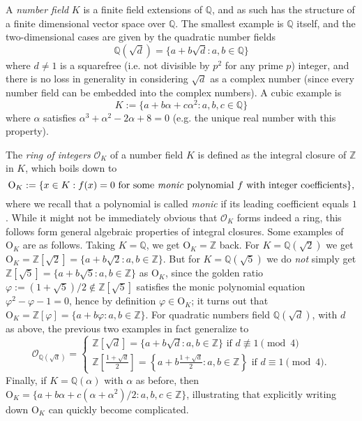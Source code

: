 \documentclass[a4paper,USenglish,cleveref, autoref, thm-restate]{lipics-v2021}
\newcommand{\OK}{\mathrm{O}_K}
\newcommand{\Q}{\mathbb{Q}}
\newcommand{\Z}{\mathbb{Z}}
\begin{document}
A \emph{number field} $K$ is a finite field extensions of $\Q$, and as such has the structure of a finite dimensional vector space over $\Q$. The smallest example is $\Q$ itself, and the two-dimensional cases are given by the quadratic number fields
\[\Q(\sqrt{d})=\{a+b\sqrt{d} : a,b \in \Q\}\]
where $d\not=1$ is a squarefree (i.e. not divisible by $p^2$ for any prime $p$) integer, and there is no loss in generality in considering $\sqrt{d}$ as a complex number (since every number field can be embedded into the complex numbers).
A cubic example is
\[K:=\{a+b\alpha+c \alpha^2: a,b,c \in \Q\}\]
where $\alpha$ satisfies $\alpha^3 + \alpha^2 - 2\alpha + 8=0$ (e.g. the unique real number with this property).

The \emph{ring of integers} $\mathcal{O}_K$ of a number field $K$ is defined as the integral closure of $\Z$ in $K$, which boils down to
\[\OK := \{x \in K : f(x)=0 \text{ for some \emph{monic} polynomial } f \text{ with integer coefficients}\},\]
where we recall that a polynomial is called \emph{monic} if its leading coefficient equals $1$.
While it might not be immediately obvious that $\mathcal{O}_K$ forms indeed a ring, this follows form general algebraic properties of integral closures.
Some examples of $\OK$ are as follows. Taking $K=\Q$, we get $\OK=\Z$ back. For $K=\Q(\sqrt{2})$ we get $\OK=\Z[\sqrt{2}]=\{a+b\sqrt{2} : a,b \in \Z\}$. But for $K=\Q(\sqrt{5})$ we do \emph{not} simply get $\Z[\sqrt{5}]=\{a+b\sqrt{5} : a,b \in \Z\}$ as $\OK$, since the golden ratio $\varphi:=(1+\sqrt{5})/2\not\in \Z[\sqrt{5}]$ satisfies the monic polynomial equation $\varphi^2-\varphi-1=0$, hence by definition $\varphi \in \OK$; it turns out that $\OK=\Z[\varphi]=\{a+b\varphi : a,b \in \Z\}$. For quadratic numbers field $\Q(\sqrt{d})$, with $d$ as above, the previous two examples in fact generalize to
\begin{equation*}
\mathcal{O}_{\Q(\sqrt{d})}=
\begin{cases}
\Z[\sqrt{d}]=\{a+b\sqrt{d}: a,b \in \Z\} \text { if } d \not\equiv 1 \pmod{4}\\
 \Z\left[\frac{1+\sqrt{d}}{2}\right]=\left\{a+b \frac{1+\sqrt{d}}{2} : a,b \in \Z \right\} \text { if } d \equiv 1 \pmod{4}.
\end{cases}
\end{equation*}
Finally, if $K=\Q(\alpha)$ with $\alpha$ as before, then $\OK=\{a+b \alpha+c (\alpha+\alpha^2)/2 : a,b,c \in \Z\}$, illustrating that explicitly writing down $\OK$ can quickly become complicated.
\end{document}
